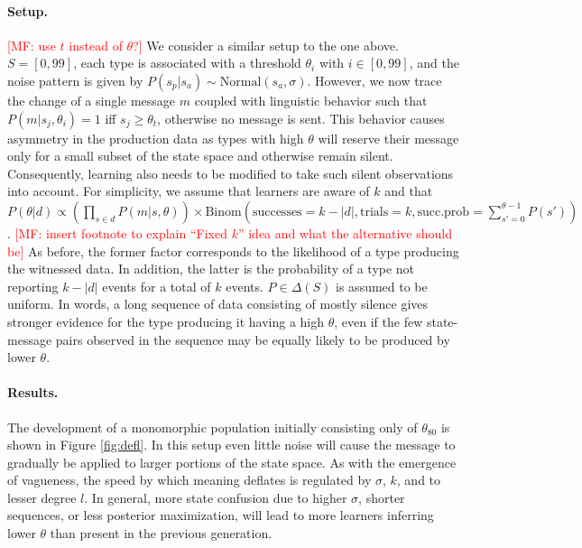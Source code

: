 \documentclass[10pt,a4paper]{article}
\newcommand{\mf}[1]{\textcolor{Red}{[MF: #1]}}
\begin{document}
\paragraph{Setup.} \mf{use $t$ instead of $\theta$?} We consider a similar setup to the one
above. $S = [0,99]$, each type is associated with a threshold $\theta_i$ with $i \in [0,99]$,
and the noise pattern is given by $P(s_p|s_a) \sim \text{Normal}(s_{a},\sigma)$. However, we
now trace the change of a single message $m$ coupled with linguistic behavior such that
$P(m|s_j,\theta_i) = 1$ iff $s_j \geq \theta_t$, otherwise no message is sent. This behavior
causes asymmetry in the production data as types with high $\theta$ will reserve their message
only for a small subset of the state space and otherwise remain silent. Consequently, learning
also needs to be modified to take such silent observations into account. For simplicity, we
assume that learners are aware of $k$ and that
$P(\theta | d) \propto (\prod_{s \in d} P(m|s,\theta)) \times \text{Binom}(\text{successes} =
k-|d|, \text{trials} = k, \text{succ.prob} = \sum_{s'=0}^{\theta-1} P(s'))$. \mf{insert
  footnote to explain ``Fixed $k$'' idea and what the alternative should be}
As before, the former factor corresponds to the likelihood of a type producing the witnessed
data.  In addition, the latter is the probability of a type not reporting $k-|d|$ events for a
total of $k$ events. $P \in \Delta(S)$ is assumed to be uniform. In words, a long sequence of
data consisting of mostly silence gives stronger evidence for the type producing it having a
high $\theta$, even if the few state-message pairs observed in the sequence may be equally
likely to be produced by lower $\theta$.

\paragraph{Results.} The development of a monomorphic population initially consisting only of $\theta_{80}$ is shown in Figure \ref{fig:defl}. In this setup even little noise will cause the message to gradually be applied to larger portions of the state space. As with the emergence of vagueness, the speed by which meaning deflates is regulated by $\sigma$, $k$, and to lesser degree $l$. In general, more state confusion due to higher $\sigma$, shorter sequences, or less posterior maximization, will lead to more learners inferring lower $\theta$ than present in the previous generation. 
\end{document}
